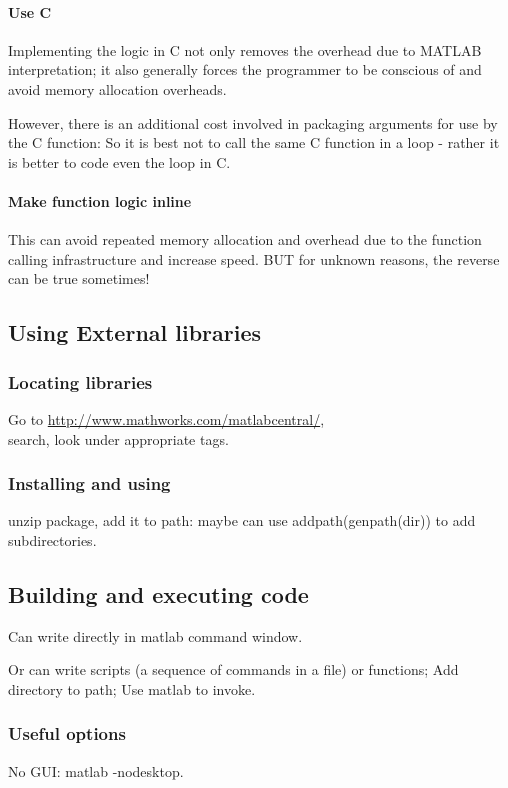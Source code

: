 \paragraph{Use C}
Implementing the logic in C not only removes the overhead due to MATLAB interpretation; it also generally forces the programmer to be conscious of and avoid memory allocation overheads.

However, there is an additional cost involved in packaging arguments for use by the C function: So it is best not to call the same C function in a loop - rather it is better to code even the loop in C.

\paragraph{Make function logic inline}
This can avoid repeated memory allocation and overhead due to the function calling infrastructure and increase speed. BUT for unknown reasons, the reverse can be true sometimes!

\subsection{Using External libraries}
\subsubsection{Locating libraries}
Go to \url{http://www.mathworks.com/matlabcentral/}, \\ search, look under appropriate tags.

\subsubsection{Installing and using}
unzip package, add it to path: maybe can use addpath(genpath(dir)) to add subdirectories.


\subsection{Building and executing code}
Can write directly in matlab command window.

Or can write scripts (a sequence of commands in a file) or functions; Add directory to path; Use matlab to invoke.

\subsubsection{Useful options}
No GUI: matlab -nodesktop.

